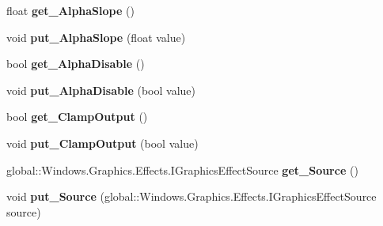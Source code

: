 \begin{DoxyCompactItemize}
float {\bfseries get\+\_\+\+Alpha\+Slope} ()
\item 
\mbox{\label{class_microsoft_1_1_graphics_1_1_canvas_1_1_effects_1_1_linear_transfer_effect_a2de1e2340076a5720246eb8e51404f74}} 
void {\bfseries put\+\_\+\+Alpha\+Slope} (float value)
\item 
\mbox{\label{class_microsoft_1_1_graphics_1_1_canvas_1_1_effects_1_1_linear_transfer_effect_a927e3a0868674914e4559762049edeff}} 
bool {\bfseries get\+\_\+\+Alpha\+Disable} ()
\item 
\mbox{\label{class_microsoft_1_1_graphics_1_1_canvas_1_1_effects_1_1_linear_transfer_effect_a652ca7e49961cec56a8e9cdffc0e647c}} 
void {\bfseries put\+\_\+\+Alpha\+Disable} (bool value)
\item 
\mbox{\label{class_microsoft_1_1_graphics_1_1_canvas_1_1_effects_1_1_linear_transfer_effect_af99a192609cbc8a5e3567a286dd2fdf8}} 
bool {\bfseries get\+\_\+\+Clamp\+Output} ()
\item 
\mbox{\label{class_microsoft_1_1_graphics_1_1_canvas_1_1_effects_1_1_linear_transfer_effect_a37d74d7e18b00ba5a5091ee75f369f63}} 
void {\bfseries put\+\_\+\+Clamp\+Output} (bool value)
\item 
\mbox{\label{class_microsoft_1_1_graphics_1_1_canvas_1_1_effects_1_1_linear_transfer_effect_a150d940d9e3782329842305e98b627ca}} 
global\+::\+Windows.\+Graphics.\+Effects.\+I\+Graphics\+Effect\+Source {\bfseries get\+\_\+\+Source} ()
\item 
\mbox{\label{class_microsoft_1_1_graphics_1_1_canvas_1_1_effects_1_1_linear_transfer_effect_a0e01c337f2d7fd6eddb9568ce763ab01}} 
void {\bfseries put\+\_\+\+Source} (global\+::\+Windows.\+Graphics.\+Effects.\+I\+Graphics\+Effect\+Source source)

\end{DoxyCompactItemize}

